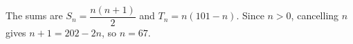 The sums are $S_n=\dfrac{n(n+1)}{2}$ and $T_n=n(101-n)$. Since $n>0$, cancelling $n$ gives $n+1=202-2n$, so $\boxed{n=67}$.
